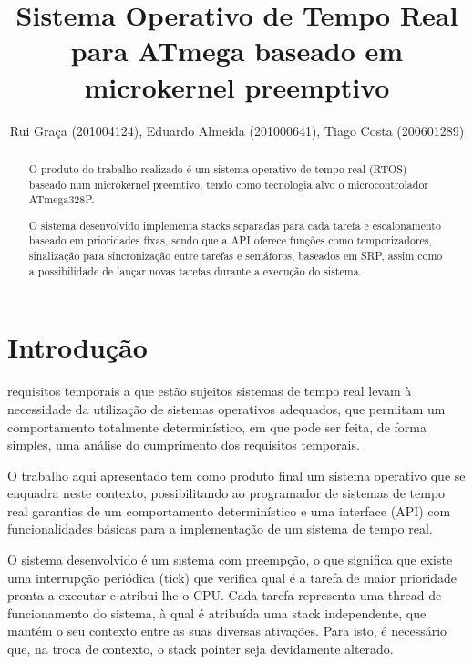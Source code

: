 \documentclass[journal]{IEEEtran}
\begin{document}
\title{Sistema Operativo de Tempo Real para ATmega baseado em microkernel preemptivo}
\author{Rui Graça (201004124), Eduardo Almeida (201000641), Tiago Costa (200601289)}

%
{}


\maketitle


\begin{abstract}
	O produto do trabalho realizado é um sistema operativo de tempo real (RTOS) baseado num microkernel preemtivo, tendo como tecnologia alvo o microcontrolador
	ATmega328P.

	O sistema desenvolvido implementa stacks separadas para cada tarefa e escalonamento baseado em prioridades fixas, sendo que a API oferece funções como temporizadores,
	sinalização para sincronização entre tarefas e semáforos, baseados em SRP, assim como a possibilidade de lançar novas tarefas durante a execução do sistema.
\end{abstract}

\section{Introdução}
 requisitos temporais a que estão sujeitos sistemas de tempo real levam à necessidade da utilização de sistemas operativos adequados, que permitam um
comportamento totalmente determinístico, em que pode ser feita, de forma simples, uma análise do cumprimento dos requisitos temporais.

O trabalho aqui apresentado tem como produto final um sistema operativo que se enquadra neste contexto, possibilitando ao programador de sistemas de tempo real garantias
de um comportamento determinístico e uma interface (API) com funcionalidades básicas para a implementação de um sistema de tempo real.

O sistema desenvolvido é um sistema com preempção, o que significa que existe uma interrupção periódica (tick) que verifica qual é a tarefa de maior prioridade pronta a
executar e atribui-lhe o CPU.
Cada tarefa representa uma thread de funcionamento do sistema, à qual é atribuída uma stack independente, que mantém o seu contexto entre as suas diversas ativações.
Para isto, é necessário que, na troca de contexto, o stack pointer seja devidamente alterado.
\end{document}

